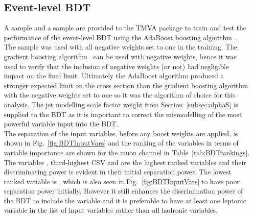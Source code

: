 \subsection{Event-level BDT}
A \ttbar sample and a \tttt sample are provided to the TMVA package to train and test the performance of the event-level BDT using the AdaBoost boosting algorithm~\cite{FREUND1997119}. The \MADGRAPH\aMCATNLO \tttt sample was used with all negative weights set to one in the training. The gradient boosting algorithm~\cite{mason1999boosting} can be used with negative weights, hence it was used to verify that the inclusion of negative weights (or not) had negligible impact on the final limit. Ultimately the AdaBoost algorithm produced a stronger expected limit on the \tttt cross section than the gradient boosting algorithm with the negative weights set to one so it was the algorithm of choice for this analysis. The jet modelling scale factor weight from Section~\ref{subsec:alphaS} is supplied to the BDT as it is important to correct the mismodelling of the most powerful variable input into the BDT.\\
The separation of the input variables, before any boost weights are applied, is shown in Fig.~\ref{fig:BDTInputVars} and the ranking of the variables in terms of variable importance are shown for the muon channel in Table~\ref{tab:BDTrankings}. The variables \njets, third-highest CSV and \htrat are the highest ranked variables and their discriminating power is evident in their initial separation power. The lowest ranked variable is \leadleppt, which is also seen in Fig.~\ref{fig:BDTInputVars} to have poor separation power initially. However it still enhances the discrimination power of the BDT to include the \leadleppt variable and it is preferable to have at least one leptonic variable in the list of input variables rather than all hadronic variables.

